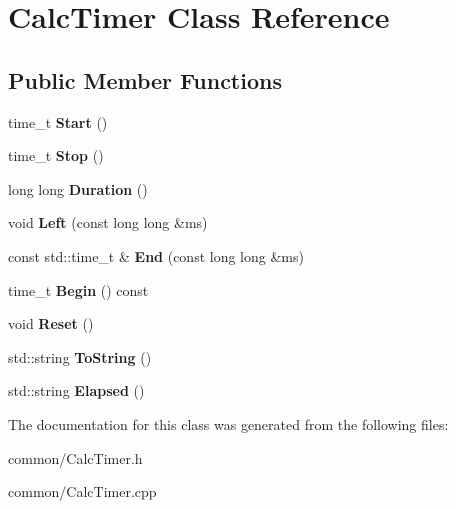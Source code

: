 \hypertarget{class_calc_timer}{}\section{Calc\+Timer Class Reference}
\label{class_calc_timer}
\subsection*{Public Member Functions}
\begin{DoxyCompactItemize}
\item 
\mbox{\label{class_calc_timer_a072e9bf1de87302826a5de2cc36ed9a1}} 
time\+\_\+t {\bfseries Start} ()
\item 
\mbox{\label{class_calc_timer_a7026b92f345dbadd6341a57c4ca2b249}} 
time\+\_\+t {\bfseries Stop} ()
\item 
\mbox{\label{class_calc_timer_a7d0990bf0484f8db9ab80bafedeedb17}} 
long long {\bfseries Duration} ()
\item 
\mbox{\label{class_calc_timer_aa50c249f66660b46c3ff8d86cc187129}} 
void {\bfseries Left} (const long long \&ms)
\item 
\mbox{\label{class_calc_timer_a7872ff0b769d29b8eff336bc4d279756}} 
const std\+::time\+\_\+t \& {\bfseries End} (const long long \&ms)
\item 
\mbox{\label{class_calc_timer_a31d046aca4d4d51fccbb2e53294f441a}} 
time\+\_\+t {\bfseries Begin} () const
\item 
\mbox{\label{class_calc_timer_ae5ee06875f8d998eada9cc4e207f0563}} 
void {\bfseries Reset} ()
\item 
\mbox{\label{class_calc_timer_a6b7db67583f793503861e71ea003f7e0}} 
std\+::string {\bfseries To\+String} ()
\item 
\mbox{\label{class_calc_timer_a0e86da382dd944e9a94ea7497eeee24d}} 
std\+::string {\bfseries Elapsed} ()
\end{DoxyCompactItemize}


The documentation for this class was generated from the following files\+:\begin{DoxyCompactItemize}
\item 
common/Calc\+Timer.\+h\item 
common/Calc\+Timer.\+cpp\end{DoxyCompactItemize}
